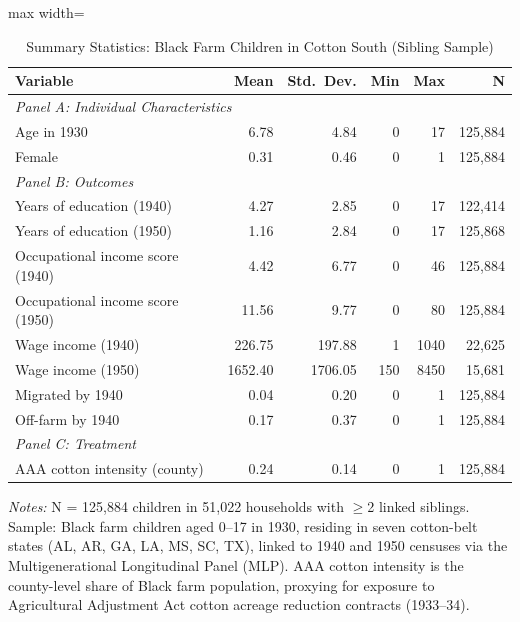 \begin{table}[H]
\centering
\caption{Summary Statistics: Black Farm Children in Cotton South (Sibling Sample)}
\label{tab:summary}
\begin{threeparttable}
\begin{adjustbox}{max width=\textwidth}
\begin{tabular}{lrrrrr}
\toprule
Variable & Mean & Std.\ Dev. & Min & Max & N \\
\midrule
\multicolumn{6}{l}{\textit{Panel A: Individual Characteristics}} \\
Age in 1930                                &     6.78 &     4.84 &        0 &       17 & 125,884 \\
Female                                     &     0.31 &     0.46 &        0 &        1 & 125,884 \\
\midrule
\multicolumn{6}{l}{\textit{Panel B: Outcomes}} \\
Years of education (1940)                  &     4.27 &     2.85 &        0 &       17 & 122,414 \\
Years of education (1950)                  &     1.16 &     2.84 &        0 &       17 & 125,868 \\
Occupational income score (1940)           &     4.42 &     6.77 &        0 &       46 & 125,884 \\
Occupational income score (1950)           &    11.56 &     9.77 &        0 &       80 & 125,884 \\
Wage income (1940)                         &   226.75 &   197.88 &        1 &     1040 & 22,625 \\
Wage income (1950)                         &  1652.40 &  1706.05 &      150 &     8450 & 15,681 \\
Migrated by 1940                           &     0.04 &     0.20 &        0 &        1 & 125,884 \\
Off-farm by 1940                           &     0.17 &     0.37 &        0 &        1 & 125,884 \\
\midrule
\multicolumn{6}{l}{\textit{Panel C: Treatment}} \\
AAA cotton intensity (county)              &     0.24 &     0.14 &        0 &        1 & 125,884 \\
\bottomrule
\end{tabular}
\end{adjustbox}
\begin{tablenotes}[flushleft]
\small
\item \textit{Notes:} N = 125,884 children in 51,022 households with $\geq$2 linked siblings. Sample: Black farm children aged 0--17 in 1930, residing in seven cotton-belt states (AL, AR, GA, LA, MS, SC, TX), linked to 1940 and 1950 censuses via the Multigenerational Longitudinal Panel (MLP). AAA cotton intensity is the county-level share of Black farm population, proxying for exposure to Agricultural Adjustment Act cotton acreage reduction contracts (1933--34).
\end{tablenotes}
\end{threeparttable}
\end{table}

